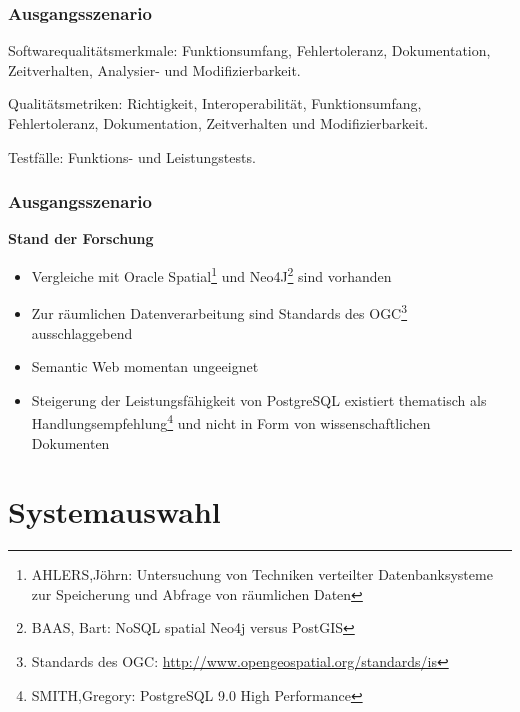 \documentclass{beamer}
\begin{document}
\begin{frame}\frametitle{Ausgangsszenario}
\begin{block}{Softwarequalitätsmerkmale:}
Funktionsumfang, Fehlertoleranz, Dokumentation, Zeitverhalten, Analysier- und Modifizierbarkeit.
\end{block}

\vspace{\baselineskip}

\begin{block}{Qualitätsmetriken:}
Richtigkeit, Interoperabilität, Funktionsumfang, Fehlertoleranz, Dokumentation, Zeitverhalten und Modifizierbarkeit.
\end{block}

\vspace{\baselineskip}

\begin{block}{Testfälle:}
Funktions- und Leistungstests.
\end{block}
\end{frame}

\begin{frame}\frametitle{Ausgangsszenario}
\begin{center}
\textbf{Stand der Forschung}
\end{center}

\begin{itemize}
\item Vergleiche mit Oracle Spatial\footnote{AHLERS,Jöhrn: Untersuchung von Techniken verteilter Datenbanksysteme zur Speicherung und Abfrage von räumlichen Daten} und Neo4J\footnote{BAAS, Bart: NoSQL spatial Neo4j versus PostGIS} sind vorhanden
\item Zur räumlichen Datenverarbeitung sind Standards des OGC\footnote{Standards des OGC: \url{http://www.opengeospatial.org/standards/is}} ausschlaggebend
\item Semantic Web momentan ungeeignet
\item Steigerung der Leistungsfähigkeit von PostgreSQL existiert thematisch als Handlungsempfehlung\footnote{SMITH,Gregory: PostgreSQL 9.0 High Performance} und nicht in Form von wissenschaftlichen Dokumenten
\end{itemize}

\end{frame}

\section{Systemauswahl}
\end{document}

